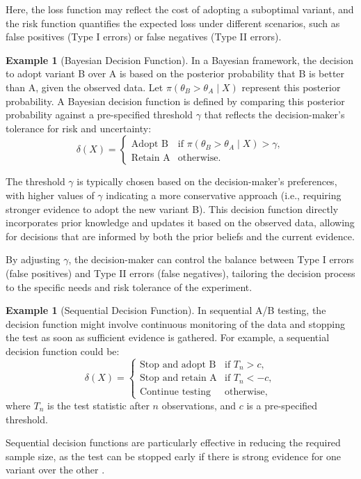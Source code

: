 \documentclass[magisterska, english]{pwr_wmat_praca_dyplomowa}
\theoremstyle{plain}
\numberwithin{theorem}{chapter}
\theoremstyle{definition}
\numberwithin{theorem}{chapter}
\newtheorem{example}[theorem]{Example}
\begin{document}
Here, the loss function may reflect the cost of adopting a suboptimal variant, and the risk function quantifies the expected loss under different scenarios, such as false positives (Type I errors) or false negatives (Type II errors).

\begin{example}[Bayesian Decision Function]

In a Bayesian framework, the decision to adopt variant B over A is based on the posterior probability that B is better than A, given the observed data. Let \( \pi(\theta_B > \theta_A \mid X) \) represent this posterior probability. A Bayesian decision function is defined by comparing this posterior probability against a pre-specified threshold \( \gamma \) that reflects the decision-maker's tolerance for risk and uncertainty:
\[
\delta(X) = 
\begin{cases} 
	\text{Adopt B} & \text{if } \pi(\theta_B > \theta_A \mid X) > \gamma, \\
	\text{Retain A} & \text{otherwise}.
\end{cases}
\]
\end{example}

The threshold \( \gamma \) is typically chosen based on the decision-maker's preferences, with higher values of \( \gamma \) indicating a more conservative approach (i.e., requiring stronger evidence to adopt the new variant B). This decision function directly incorporates prior knowledge and updates it based on the observed data, allowing for decisions that are informed by both the prior beliefs and the current evidence.

By adjusting \( \gamma \), the decision-maker can control the balance between Type I errors (false positives) and Type II errors (false negatives), tailoring the decision process to the specific needs and risk tolerance of the experiment.

\begin{example}[Sequential Decision Function]
	In sequential A/B testing, the decision function might involve continuous monitoring of the data and stopping the test as soon as sufficient evidence is gathered. For example, a sequential decision function could be:
	\[
	\delta(X) = 
	\begin{cases} 
		\text{Stop and adopt B} & \text{if } T_n > c, \\
		\text{Stop and retain A} & \text{if } T_n < -c, \\
		\text{Continue testing} & \text{otherwise},
	\end{cases}
	\]
	where \( T_n \) is the test statistic after \( n \) observations, and \( c \) is a pre-specified threshold.
\end{example}
 Sequential decision functions are particularly effective in reducing the required sample size, as the test can be stopped early if there is strong evidence for one variant over the other \cite{Wald1947}.
\end{document}
